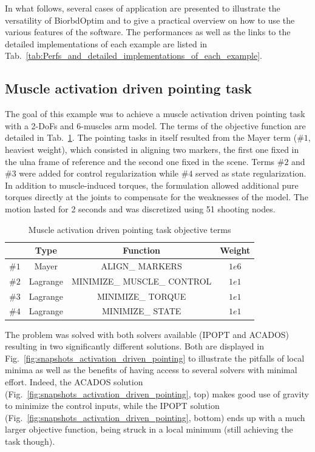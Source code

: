 In what follows, several cases of application are presented to illustrate the versatility of BiorbdOptim and to give a practical overview on how to use the various features of the software.
The performances as well as the links to the detailed implementations of each example are listed in Tab.~\ref{tab:Perfs_and_detailed_implementations_of_each_example}.


\subsection{Muscle activation driven pointing task}

The goal of this example was to achieve a muscle activation driven pointing task with a 2-DoFs and 6-muscles arm model. 
The terms of the objective function are detailed in Tab.~\ref{tab:Muscle_activation_driven_pointing_task}.
The pointing tasks in itself resulted from the Mayer term ($\#1$, heaviest weight), which consisted in aligning two markers, the first one fixed in the ulna frame of reference and the second one fixed in the scene.
Terms $\#2$ and $\#3$ were added for control regularization while $\#4$ served as state regularization. 
In addition to muscle-induced torques, the formulation allowed additional pure torques directly at the joints to compensate for the weaknesses of the model.
The motion lasted for 2 seconds and was discretized using 51 shooting nodes.
%

%
\begin{table}[h!]
\caption{\small Muscle activation driven pointing task objective terms}
\label{tab:Muscle_activation_driven_pointing_task}
\centering
\begin{tabular}{c c c c}
\toprule 
& Type & Function & Weight \\ 
\midrule
$\#1$ & Mayer & ALIGN\_ MARKERS & $1e6$ \\ 
\midrule
$\#2$ & Lagrange & MINIMIZE\_ MUSCLE\_ CONTROL & $1e1$ \\ 
\midrule
$\#3$ & Lagrange & MINIMIZE\_ TORQUE & $1e1$ \\ 
\midrule
$\#4$ & Lagrange & MINIMIZE\_ STATE & $1e1$ \\
\bottomrule
\end{tabular}
\end{table}
%

%
The problem was solved with both solvers available (IPOPT and ACADOS) resulting in two significantly different solutions. 
Both are displayed in Fig.~\ref{fig:snapshots_activation_driven_pointing} to illustrate the pitfalls of local minima as well as the benefits of having access to several solvers with minimal effort.  
Indeed, the ACADOS solution (Fig.~\ref{fig:snapshots_activation_driven_pointing}, top) makes good use of gravity to minimize the control inputs, while the IPOPT solution (Fig.~\ref{fig:snapshots_activation_driven_pointing}, bottom) ends up with a much larger objective function, being struck in a local minimum (still achieving the task though). 
 
